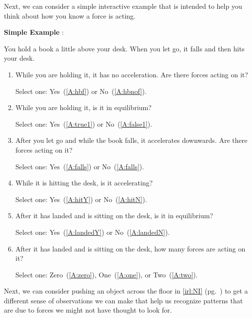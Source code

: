 \documentclass[11pt,letter,openany,makeidx]{book}
\newcounter{sample}
\newcounter{carrysample}
\renewcommand{\thesample}{Simple Example \arabic{sample}}
\newenvironment{sample}{\color{rgb:red,0;green,2;blue,1}\begin{list}{\textbf{\thesample}:}{\usecounter{sample} \setcounter{sample}{\value{carrysample}} \leftmargin 12pt}}{\end{list}\setcounter{carrysample}{\value{sample}}}
\newcommand{\THREE}[6]{\vspace{-3pt}\begin{flushright} Select one:  \mbox{#1 (\ref{#4})},  \mbox{#2 (\ref{#5})}, or \mbox{#3 (\ref{#6})}.\end{flushright}}
\newcommand{\TWO}[4]{\begin{flushright} Select one:  \mbox{#1 (\ref{#3})} or \mbox{#2 (\ref{#4})}.\end{flushright}}
\newcommand{\YN}[2]{\TWO{Yes}{No}{#1}{#2}}
\begin{document}
Next, we can consider a simple interactive example that is intended to help you think about how you know a force is acting.
%
\begin{sample}
\item\label{IQ:holdbook} You hold a book a little above your desk.  When you let go, it falls and then hits your desk.
    \begin{enumerate}
    \item While you are holding it, it has no acceleration.  Are there forces acting on it?  \YN{A:hbf}{A:hbnof}
    \item While you are holding it, is it in equilibrium?  \YN{A:true1}{A:false1}
    \item After you let go and while the book falls, it accelerates downwards.  Are there forces acting on it?  \YN{A:falls}{A:falls}
    \item While it is hitting the desk, is it accelerating?  \YN{A:hitY}{A:hitN}
    \item After it has landed and is sitting on the desk, is it in equilibrium? \YN{A:landedY}{A:landedN}
    \item After it has landed and is sitting on the desk, how many forces are acting on it? \THREE{Zero}{One}{Two}{A:zero}{A:one}{A:two}
    \end{enumerate}
\end{sample}
%
Next, we can \hypertarget{d:irlNI}{consider} pushing an object across the floor in \autoref{irl:NI} (pg.~\pageref{irl:NI}) to get a different sense of observations we can make that help us recognize patterns that are due to forces we might not have thought to look for.
%
\end{document}
